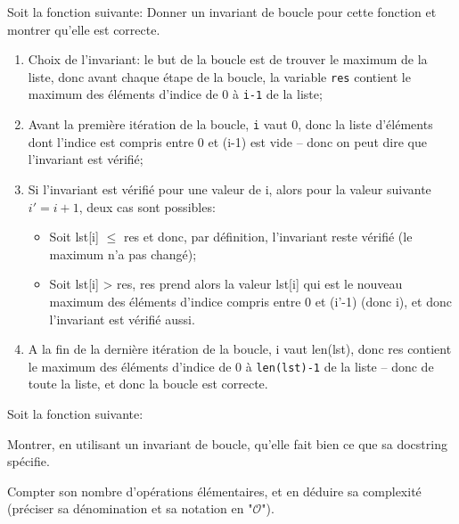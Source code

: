 \documentclass[12pt]{article}
\begin{document}
	\begin{MonExo}
		Soit la fonction suivante:
		Donner un invariant de boucle pour cette fonction et montrer qu'elle est correcte.
	\end{MonExo}
	
	\begin{MaReponse}
		\begin{enumerate}
			\item Choix de l'invariant: le but de la boucle est de trouver le maximum de la liste, donc avant chaque étape de la boucle, la variable \texttt{res} contient le maximum des éléments d'indice de 0 à \texttt{i-1} de la liste;
			\item Avant la première itération de la boucle, \texttt{i} vaut 0, donc la liste d'éléments dont l'indice est compris entre 0 et (i-1) est vide -- donc on peut dire que l'invariant est vérifié;
			\item Si l'invariant est vérifié pour une valeur de i, alors pour la valeur suivante $i' = i + 1$, deux cas sont possibles:
			\begin{itemize}
				\item Soit lst[i] $\leq$ res et donc, par définition, l'invariant reste vérifié (le maximum n'a pas changé);
				\item Soit lst[i] > res, res prend alors la valeur lst[i] qui est le nouveau maximum des éléments d'indice compris entre 0 et (i'-1) (donc i), et donc l'invariant est vérifié aussi.
			\end{itemize}
			\item A la fin de la dernière itération de la boucle, i vaut len(lst), donc res contient le maximum des éléments d'indice de 0 à \texttt{len(lst)-1} de la liste -- donc de toute la liste, et donc la boucle est correcte.
		\end{enumerate}
	\end{MaReponse}
	
	\begin{MonExo}
		Soit la fonction suivante:
		\begin{alphenum}
			\item Montrer, en utilisant un invariant de boucle, qu'elle fait bien ce que sa docstring spécifie.
			\item Compter son nombre d'opérations élémentaires, et en déduire sa complexité (préciser sa dénomination et sa notation en "$\mathcal{O}$").
		\end{alphenum}
	\end{MonExo}
	
\end{document}
